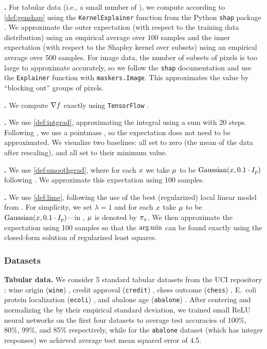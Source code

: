 \textbf{\shap{}.} For tabular data (i.e., a small number of \covnames{}), we compute \shap{} according to \cref{def:genshap} using the \texttt{KernelExplainer} function from the Python \texttt{shap} package \citep{lundberg17shapley}. We approximate the outer expectation (with respect to the training data distribution) using an empirical average over 100 samples and the inner expectation (with respect to the Shapley kernel over subsets) using an empirical average over 500 samples. For image data, the number of subsets of pixels is too large to approximate accurately, so we follow the \texttt{shap} documentation and use the \texttt{Explainer} function with \texttt{maskers.Image}. This approximates the \shap{} value by ``blocking out'' groups of pixels.

\textbf{\vanillagrad{}.} We compute $\nabla f$ exactly using \texttt{TensorFlow} \citep{tensorflow2015-whitepaper}.

\textbf{\intgrad{}.} We use \cref{def:intgrad}, approximating the integral using a sum with 20 steps. Following \citet{sundararajan17integrated}, we use a pointmass \basename{}, so the expectation does not need to be approximated. 
We visualize two baselines: all \covnames{} set to zero (the mean of the data after rescaling), and all \covnames{} set to their minimum value.

\textbf{\smoothgrad{}.} We use \cref{def:smoothgrad}, where for each $x$ we take $\mu$ to be $\mathrm{Gaussian}(x, 0.1 \cdot I_p)$ following \citet{smilkov17smoothgrad}. We approximate this expectation using 100 samples.

\textbf{\lime{}.} We use \cref{def:lime}, following the use of the best (regularized) local linear model from \citet{ribeiro16lime}. For simplicity, we set $\lambda = 1$ and for each $x$ take $\mu$ to be $\mathrm{Gaussian}(x, 0.1 \cdot I_p)$---in \citet{ribeiro16lime}, $\mu$ is denoted by $\pi_x$. We then approximate the expectation using 100 samples so that the $\argmin$ can be found exactly using the closed-form solution of regularized least squares.



\subsubsection{Datasets}

\textbf{Tabular data.} We consider 5 standard tabular datasets from the UCI repository \citep{Dua19UCI}: wine origin (\texttt{wine}) \citep{forina86wine}, credit approval  (\texttt{credit}) \citep{quinlan1987credit}, chess outcome (\texttt{chess}) \citep{bain1994chess}, E.~coli protein localization (\texttt{ecoli}) \citep{nakai1991ecoli}, and abalone age (\texttt{abalone}) \citep{nash1994abalone}. After centering and normalizing the \covnames{} by their empirical standard deviation, we trained small ReLU neural networks on the first four datasets to average test accuracies of 100\%, 80\%, 99\%, and 85\% respectively, while for the \texttt{abalone} dataset (which has integer responses) we achieved average test mean squared error of 4.5.

